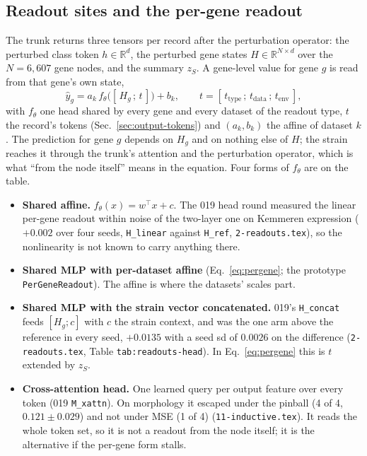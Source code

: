 \subsection{Readout sites and the per-gene readout}
\label{sec:output-sites}

The trunk returns three tensors per record after the perturbation operator: the perturbed
class token $h \in \mathbb{R}^d$, the perturbed gene states $H \in \mathbb{R}^{N \times d}$
over the $N = 6{,}607$ gene nodes, and the summary $z_S$. A gene-level value for gene $g$
is read from that gene's own state,
\begin{equation}
\hat y_{g} = a_{k}\, f_\theta\!\big([\,H_g \,;\, t\,]\big) + b_{k},
\qquad t = [\,t_{\mathrm{type}} \,;\, t_{\mathrm{data}} \,;\, t_{\mathrm{env}}\,],
\label{eq:pergene}
\end{equation}
with $f_\theta$ one head shared by every gene and every dataset of the readout type, $t$
the record's tokens (Sec.~\ref{sec:output-tokens}) and $(a_k, b_k)$ the affine of dataset
$k$. The prediction for gene $g$ depends on $H_g$ and on nothing else of $H$; the strain
reaches it through the trunk's attention and the perturbation operator, which is what
``from the node itself'' means in the equation. Four forms of $f_\theta$ are on the table.

\begin{itemize}
\item \textbf{Shared affine.} $f_\theta(x) = w^\top x + c$. The 019 head round measured
the linear per-gene readout within noise of the two-layer one on Kemmeren expression
($+0.002$ over four seeds, \texttt{H\_linear} against \texttt{H\_ref},
\texttt{2-readouts.tex}), so the nonlinearity is not known to carry anything there.
\item \textbf{Shared MLP with per-dataset affine} (Eq.~\ref{eq:pergene}; the prototype
\texttt{PerGeneReadout}). The affine is where the datasets' scales part.
\item \textbf{Shared MLP with the strain vector concatenated.} 019's \texttt{H\_concat}
feeds $[H_g ; c]$ with $c$ the strain context, and was the one arm above the reference in
every seed, $+0.0135$ with a seed sd of $0.0026$ on the difference (\texttt{2-readouts.tex},
Table \texttt{tab:readouts-head}). In Eq.~\ref{eq:pergene} this is $t$ extended by $z_S$.
\item \textbf{Cross-attention head.} One learned query per output feature over every token
(019 \texttt{M\_xattn}). On morphology it escaped under the pinball (4 of 4, $0.121 \pm
0.029$) and not under MSE (1 of 4) (\texttt{11-inductive.tex}). It reads the whole token
set, so it is not a readout from the node itself; it is the alternative if the per-gene
form stalls.
\end{itemize}

